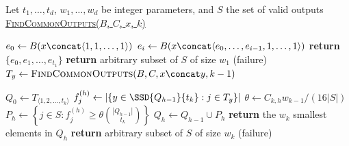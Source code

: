 \begin{itemize}
\begin{itemize}
\begin{algorithm}[htb]
  \begin{algorithmic}[1]
    \Statex Let $t_1,\ldots,t_d$, $w_1,\ldots,w_d$ be integer parameters, and $S$ the set of valid outputs
    \Statex
    \Statex \underline{\textsc{FindCommonOutputs($B$, $C$, $x$, $k$)}} 
    \LineComment{Inputs: function $B \colon [n]^\rl \to [n]$, 
      matrix $C \in [1,2)^{d \times \NN}$, stream prefix $x \in [n]^{t_k + \cdots + t_1}$}
    
        \State $e_0 \gets B(x \concat \langle 1,1,\ldots,1\rangle)$\label{step:pd-base-case-start}
          \State $e_i \gets B(x \concat \langle e_0,\ldots,e_{i-1},1,\ldots,1\rangle)$ \label{step:pd-base-case-mid}
        \EndFor
          \State \textbf{return} $\{e_0,e_1,\ldots,e_{t_1}\}$
        \EndIf
        \State \textbf{return} arbitrary subset of $S$ of size $w_1$ (failure)
    \Else
            \State $T_{y} \gets \textsc{FindCommonOutputs}(B, C, x \concat y, k-1)$ \label{step:pd-compute-t}
        \EndFor
    
        \State $Q_0 \gets T_{\langle 1,2,\ldots,t_k \rangle}$
        \label{step:pd-for-loop-start}
                \State $f_{j}^{(h)} \gets \left| \left\{ y \in \SSD{Q_{h-1}}{t_k} :
                  j \in T_{y} \right\} \right|$ \label{step:pd-def-f}
            \EndFor
            \State $\theta \gets C_{k,h} w_{k-1} / (16 |S|)$ 
            \State $P_h \gets \left\{j \in S : f_{j}^{(h)} \ge 
              \theta \binom{|Q_{h-1}|}{t_k} \right\}$ \label{step:pd-comp-ph}
            \State $Q_h \gets Q_{h-1} \cup P_h$
              \State \textbf{return} the $w_k$ smallest elements in $Q_h$ \label{step:pd-good-exit}
            \EndIf
        \EndFor \label{step:pd-for-loop-end}
        \State \textbf{return} arbitrary subset of $S$ of size $w_k$ (failure)\label{step:pd-bad-exit}
    \EndIf
  \end{algorithmic}
  

\end{algorithm}
\end{itemize}
\end{itemize}
